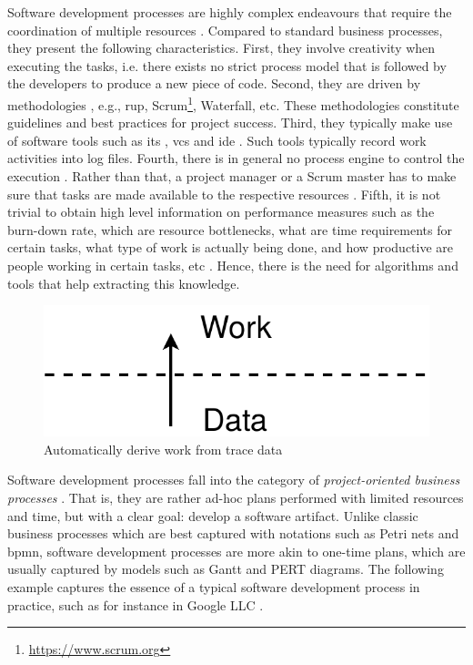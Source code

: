 Software development processes are highly complex endeavours that require the coordination of multiple resources \citep{Kraut1995,Crowston2005}. Compared to standard business processes, they present the following characteristics. First, 
they involve creativity \citep{DeLaBarra2013,DBLP:journals/corr/abs-1305-6045,Aldave2019} when executing the tasks, i.e. there exists no strict process model that is followed by the developers to produce a new piece of code. Second, they are driven by methodologies \citep{Wynekoop1997}, e.g., \gls{rup}, Scrum\footnote{\url{https://www.scrum.org}}, Waterfall, etc. These methodologies constitute guidelines and best practices for project success. Third, they typically make use of software tools \citep{DBLP:books/daglib/0022944} such as \gls{its} , \gls{vcs}  and \gls{ide} . Such tools typically record work activities into log files. Fourth, there is in general no process engine to control the execution \citep{Zahran1998}. Rather than that, a project manager or a Scrum master has to make sure that tasks are made available to the respective resources \citep{DBLP:books/daglib/0014800}. Fifth, it is not trivial to obtain high level information on performance measures such as the burn-down rate, which are resource bottlenecks, what are time requirements for certain tasks, what type of work is actually being done, and how productive are people working in certain tasks, etc \citep{DBLP:journals/csur/MeidanGRE18}. Hence, there is the need for algorithms and tools that help extracting this knowledge.

\begin{figure}
	\centering
	\includegraphics[width=0.4\linewidth]{figures/data-to-work}
	\caption{Automatically derive work from trace data}
	\label{fig:data-to-work}
\end{figure}


Software development processes fall into the category of \emph{project-oriented business processes} \citep{DBLP:conf/bpm/BalaCMRP15}. 
That is, they are rather ad-hoc plans performed with limited resources and time, but with a clear goal: develop a software artifact. Unlike classic business processes which are best captured with notations such as Petri nets and \gls{bpmn}, software development processes are more akin to one-time plans, which are usually captured by models such as Gantt and PERT diagrams. The following example captures the essence of a typical software development process in practice, such as for instance in Google LLC \citep{Henderson2017}.


